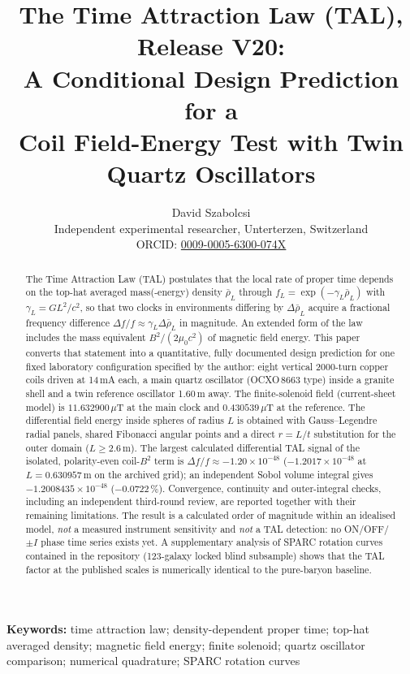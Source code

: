\documentclass[12pt,a4paper]{article}
\title{\textbf{The Time Attraction Law (TAL), Release V20:\\
A Conditional Design Prediction for a\\
Coil Field-Energy Test with Twin Quartz Oscillators}}
\author{David Szabolcsi\\[2pt]
\small Independent experimental researcher, Unterterzen, Switzerland\\
\small ORCID: \href{https://orcid.org/0009-0005-6300-074X}{0009-0005-6300-074X}}
\date{}
\newcommand{\rhob}{\bar\rho_L}
\begin{document}
\maketitle
\linenumbers

\begin{abstract}
\noindent
The Time Attraction Law (TAL) postulates that the local rate of proper time depends on the
top-hat averaged mass(-energy) density $\rhob$ through $f_L=\exp(-\gamma_L\rhob)$ with
$\gamma_L=G L^2/c^2$, so that two clocks in environments differing by $\Delta\rhob$ acquire a fractional
frequency difference $\Delta f/f\approx\gamma_L\Delta\rhob$ in magnitude. An extended form of the law
includes the mass equivalent $B^2/(2\mu_0c^2)$ of magnetic field energy. This paper converts that
statement into a quantitative, fully documented design prediction for one fixed laboratory
configuration specified by the author: eight vertical 2000-turn copper coils driven at 14\,mA each,
a main quartz oscillator (OCXO\,8663 type) inside a granite shell and a twin reference oscillator 1.60\,m away.
The finite-solenoid field (current-sheet model) is $11.632900\,\mu$T at the main clock and
$0.430539\,\mu$T at the reference. The differential field energy inside spheres of radius $L$ is
obtained with Gauss--Legendre radial panels, shared Fibonacci angular points and a direct
$r=L/t$ substitution for the outer domain ($L\ge2.6$\,m). The largest calculated differential TAL
signal of the isolated, polarity-even coil-$B^2$ term is $\Delta f/f\approx-1.20\times10^{-48}$
($-1.2017\times10^{-48}$ at $L=0.630957$\,m on the archived grid); an independent Sobol volume
integral gives $-1.2008435\times10^{-48}$ ($-0.0722\,\%$). Convergence, continuity and
outer-integral checks, including an independent third-round review, are reported together with
their remaining limitations. The result is a calculated order of magnitude within an idealised model,
\emph{not} a measured instrument sensitivity and \emph{not} a TAL detection: no ON/OFF/$\pm I$ phase
time series exists yet. A supplementary analysis of SPARC rotation curves contained in the
repository (123-galaxy locked blind subsample) shows that the TAL factor at the published scales is
numerically identical to the pure-baryon baseline.
\end{abstract}

\noindent\textbf{Keywords:} time attraction law; density-dependent proper time; top-hat averaged density;
magnetic field energy; finite solenoid; quartz oscillator comparison; numerical quadrature;
SPARC rotation curves
\end{document}
